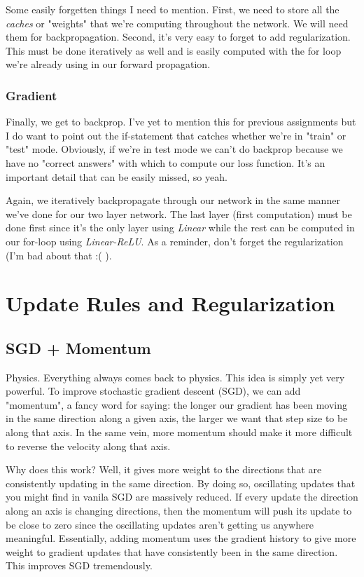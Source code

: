 \documentclass[12pt]{article}
\begin{document}
Some easily forgetten things I need to mention. First, we need to store all the \emph{caches} or 
"weights" that we're computing throughout the network. We will need them for backpropagation. Second, 
it's very easy to forget to add regularization. This must be done iteratively as well and is easily 
computed with the for loop we're already using in our forward propagation. 

\subsubsection{Gradient}
Finally, we get to backprop. I've yet to mention this for previous assignments but I do want to 
point out the if-statement that catches whether  we're in "train" or "test" mode. Obviously, if 
we're in test mode we can't do backprop because we have no "correct answers" with which to 
compute our loss function. It's an important detail that can be easily missed, so yeah. 

Again, we iteratively backpropagate through our network in the same manner we've done for our 
two layer network. The last layer (first computation) must be done first since it's the only 
layer using \emph{Linear} while the rest can be computed in our for-loop using \emph{Linear-ReLU}. 
As a reminder, don't forget the regularization (I'm bad about that :( ). 

\section{Update Rules and Regularization}
\subsection{SGD + Momentum}

Physics. Everything always comes back to physics. This idea is simply yet very powerful.
To improve stochastic gradient descent (SGD), we can add "momentum", a fancy word for saying: the
longer our gradient has been moving in the same direction along a given axis, the larger we 
want that step size to be along that axis. In the same vein, more momentum should make it more 
difficult to reverse the velocity along that axis. 

Why does this work? Well, it gives more weight
to the directions that are consistently updating in the same direction. By doing so, oscillating 
updates that you might find in vanila SGD are massively reduced. If every update the direction along
an axis is changing directions, then the momentum will push its update to be close to zero since 
the oscillating updates aren't getting us anywhere meaningful. Essentially, adding momentum 
uses the gradient history to give more weight to gradient updates that have consistently been in 
the same direction. This improves SGD tremendously. 
\end{document}
